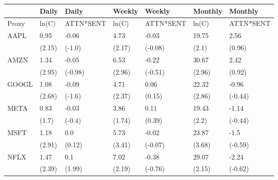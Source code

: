 \begin{tabular}{lllllll}
\toprule
{} &   Daily &      Daily &  Weekly &     Weekly & Monthly &    Monthly \\
\midrule
Proxy &   ln(C) &  ATTN*SENT &   ln(C) &  ATTN*SENT &   ln(C) &  ATTN*SENT \\
AAPL  &    0.95 &      -0.06 &    4.73 &      -0.03 &   19.75 &       2.56 \\
      &  (2.15) &     (-1.0) &  (2.17) &    (-0.08) &   (2.1) &     (0.96) \\
AMZN  &    1.34 &      -0.05 &    6.53 &      -0.22 &   30.67 &       2.42 \\
      &  (2.95) &    (-0.98) &  (2.96) &    (-0.51) &  (2.96) &     (0.92) \\
GOOGL &    1.08 &      -0.09 &    4.71 &       0.06 &   22.32 &      -0.96 \\
      &  (2.68) &     (-1.6) &  (2.37) &     (0.15) &  (2.86) &    (-0.44) \\
META  &    0.83 &      -0.03 &    3.86 &       0.11 &   19.43 &      -1.14 \\
      &   (1.7) &     (-0.4) &  (1.74) &     (0.39) &   (2.2) &    (-0.44) \\
MSFT  &    1.18 &        0.0 &    5.73 &      -0.02 &   23.87 &       -1.5 \\
      &  (2.91) &     (0.12) &  (3.41) &    (-0.07) &  (3.68) &    (-0.59) \\
NFLX  &    1.47 &        0.1 &    7.02 &      -0.38 &   29.07 &      -2.24 \\
      &  (2.39) &     (1.99) &  (2.19) &    (-0.76) &  (2.15) &    (-0.62) \\
\bottomrule
\end{tabular}
